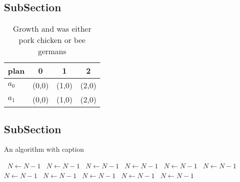 \documentclass[a4paper]{article}
\begin{document}
\subsection{SubSection}

\begin{table}
\begin{adjustbox}{width=0.6\columnwidth}
\begin{tabular}{|l|l|l|l|}
\hline
\textbf{plan} & \multicolumn{1}{c|}{\textbf{0}} & \multicolumn{1}{c|}{\textbf{1}} & \multicolumn{1}{c|}{\textbf{2}} \\ \hline
\textbf{$a_0$}  & (0,0) & (1,0) & (2,0) \\ \hline
\textbf{$a_1$}  & (0,0) & (1,0) & (2,0) \\ \hline
\end{tabular}
\end{adjustbox}
\caption{Growth and was either pork chicken or bee germans
}
\end{table}

\subsection{SubSection}

\begin{algorithm}
\caption{An algorithm with caption}
\begin{algorithmic}
\    \State $N \gets N - 1$
\    \State $N \gets N - 1$
\    \State $N \gets N - 1$
\    \State $N \gets N - 1$
\    \State $N \gets N - 1$
\    \State $N \gets N - 1$
\    \State $N \gets N - 1$
\    \State $N \gets N - 1$
\    \State $N \gets N - 1$
\    \State $N \gets N - 1$
\    \State $N \gets N - 1$
\EndWhile
\end{algorithmic}
\end{algorithm}
\end{document}
